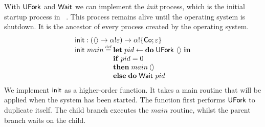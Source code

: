 \documentclass[12pt,phd,lfcs,twoside,openright,logo,leftchapter,normalheadings]{infthesis}
\theoremstyle{plain}
\theoremstyle{definition}
\begin{document}
With $\mathsf{UFork}$ and $\mathsf{Wait}$ we can implement the \emph{init} process,
which is the initial startup process in
\UNIX{}~\cite{RitchieT74}. This process remains alive until the
operating system is shutdown. It is the ancestor of every process
created by the operating system.
%
\[
  \bl
    \init : (\Unit \to \alpha \eff \varepsilon) \to \alpha \eff \{\Co;\varepsilon\}\\
    \init~main \defas
      \bl
        \Let\;pid \revto \Do\;\UFork~\Unit\;\In\\
        \If\;pid = 0\\
        \Then\;main\,\Unit\\
        \Else\;\Do\;\Wait~pid
      \el
  \el
\]
%
We implement $\mathsf{init}$ as a higher-order function. It takes a main
routine that will be applied when the system has been started. The
function first performs $\mathsf{UFork}$ to duplicate itself. The child branch
executes the $main$ routine, whilst the parent branch waits on the
child.
\end{document}
